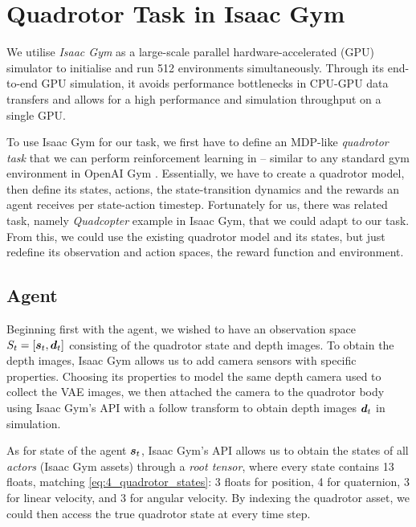 \section{Quadrotor Task in Isaac Gym}
We utilise \textit{Isaac Gym} \cite{IsaacGym} as a large-scale parallel hardware-accelerated (GPU) simulator to initialise and run 512 environments simultaneously. Through its end-to-end GPU simulation, it avoids performance bottlenecks in CPU-GPU data transfers and allows for a high performance and simulation throughput on a single GPU.

To use Isaac Gym for our task, we first have to define an MDP-like \textit{quadrotor task} that we can perform reinforcement learning in -- similar to any standard gym environment in OpenAI Gym \cite{openAIgym}. Essentially, we have to create a quadrotor model, then define its states, actions, the state-transition dynamics and the rewards an agent receives per state-action timestep. Fortunately for us, there was related task, namely \textit{Quadcopter} example in Isaac Gym, that we could adapt to our task. From this, we could use the existing quadrotor model and its states, but just redefine its observation and action spaces, the reward function and environment.

\subsection{Agent}
Beginning first with the agent, we wished to have an observation space $S_t = [{\boldsymbol{s}}_t, {\boldsymbol{d}}_t]$ consisting of the quadrotor state and depth images. To obtain the depth images, Isaac Gym allows us to add camera sensors with specific properties. Choosing its properties to model the same depth camera used to collect the VAE images, we then attached the camera to the quadrotor body using Isaac Gym's API with a follow transform to obtain depth images ${\boldsymbol{d}}_t$ in simulation.

As for state of the agent ${\boldsymbol{s}}_t$, Isaac Gym's API allows us to obtain the states of all \textit{actors} (Isaac Gym assets) through a \textit{root tensor}, where every state contains 13 floats, matching \eqref{eq:4_quadrotor_states}: 3 floats for position, 4 for quaternion, 3 for linear velocity, and 3 for angular velocity. By indexing the quadrotor asset, we could then access the true quadrotor state at every time step.

